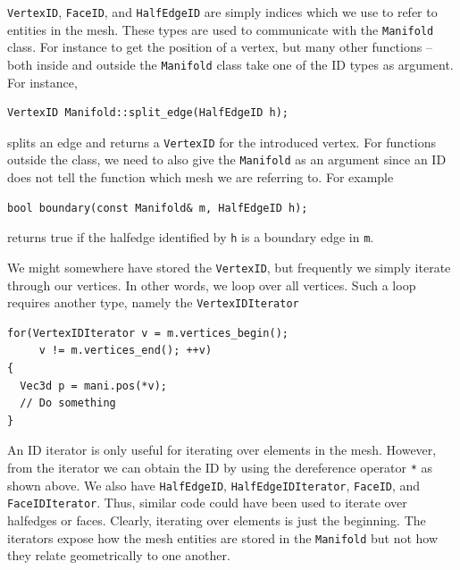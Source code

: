 \documentclass[a4paper]{article}
\begin{document}
\texttt{VertexID}, \texttt{FaceID}, and \texttt{HalfEdgeID} are simply indices which we use to refer to entities in the mesh. These types are used to communicate with the \texttt{Manifold} class. For instance to get the position of a vertex, but many other functions -- both inside and outside the \texttt{Manifold} class take one of the ID types as argument. For instance,
\begin{verbatim}
VertexID Manifold::split_edge(HalfEdgeID h);
\end{verbatim}
splits an edge and returns a \texttt{VertexID} for the introduced vertex. For functions outside the class, we need to also give the \texttt{Manifold} as an argument since an ID does not tell the function which mesh we are referring to. For example
\begin{verbatim}
bool boundary(const Manifold& m, HalfEdgeID h);
\end{verbatim}
returns true if the halfedge identified by \texttt{h} is a boundary edge in \texttt{m}.

We might somewhere have stored the \texttt{VertexID}, but frequently we simply iterate through our vertices. In other words, we loop over all vertices. Such a loop requires another type, namely the \texttt{VertexIDIterator}
\begin{verbatim}
for(VertexIDIterator v = m.vertices_begin(); 
     v != m.vertices_end(); ++v)
{
  Vec3d p = mani.pos(*v);
  // Do something
}
\end{verbatim}
An ID iterator is only useful for iterating over elements in the mesh. However, from the iterator we can obtain the ID by using the dereference operator \texttt{*} as shown above. We also have \texttt{HalfEdgeID}, \texttt{HalfEdgeIDIterator}, \texttt{FaceID}, and \texttt{FaceIDIterator}. Thus, similar code could have been used to iterate over halfedges or faces. Clearly, iterating over elements is just the beginning. The iterators expose how the mesh entities are stored in the \texttt{Manifold} but not how they relate geometrically to one another. 
\end{document}
